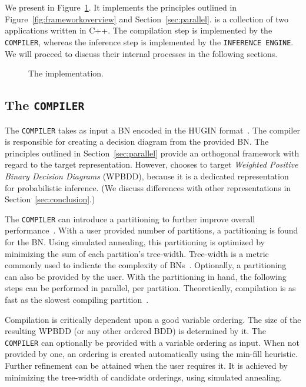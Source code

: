 \section{\toolname}

We present \toolname in Figure~\ref{fig:implementation}. It implements the principles outlined in Figure~\ref{fig:frameworkoverview} and Section~\ref{sec:parallel}. \toolname is a collection of two applications written in C++. The compilation step is implemented by the \verb+COMPILER+, whereas the inference step is implemented by the \verb+INFERENCE ENGINE+. We will proceed to discuss their internal processes in the following sections.

\begin{figure}[!t]
    \centering
    
    \caption{The implementation.}
    \label{fig:implementation}
\end{figure}

\subsection{The \texttt{COMPILER}}

The \verb+COMPILER+ takes as input a BN encoded in the HUGIN format~\cite{madsen2003hugin}. The compiler is responsible for creating a decision diagram from the provided BN. The principles outlined in Section~\ref{sec:parallel} provide an orthogonal framework with regard to the target representation. However, \toolname chooses to target \emph{Weighted Positive Binary Decision Diagrams} (WPBDD), because it is a dedicated representation for probabilistic inference. (We discuss differences with other representations in Section~\ref{sec:conclusion}.)

The \texttt{COMPILER} can introduce a partitioning to further improve overall performance~\cite{dal2017reducing}. With a user provided number of partitions, a partitioning is found for the BN. Using simulated annealing, this partitioning is optimized by minimizing the sum of each partition's tree-width. Tree-width is a metric commonly used to indicate the complexity of BNs~\cite{bollig2014width}. Optionally, a partitioning can also be provided by the user. With the partitioning in hand, the following steps can be performed in parallel, per partition. Theoretically, compilation is as fast as the slowest compiling partition~\cite{dal2018parallel}.

Compilation is critically dependent upon a good variable ordering. The size of the resulting WPBDD (or any other ordered BDD) is determined by it. The \texttt{COMPILER} can optionally be provided with a variable ordering as input. When not provided by one, an ordering is created automatically using the min-fill heuristic. Further refinement can be attained when the user requires it. It is achieved by minimizing the tree-width of candidate orderings, using simulated annealing.

